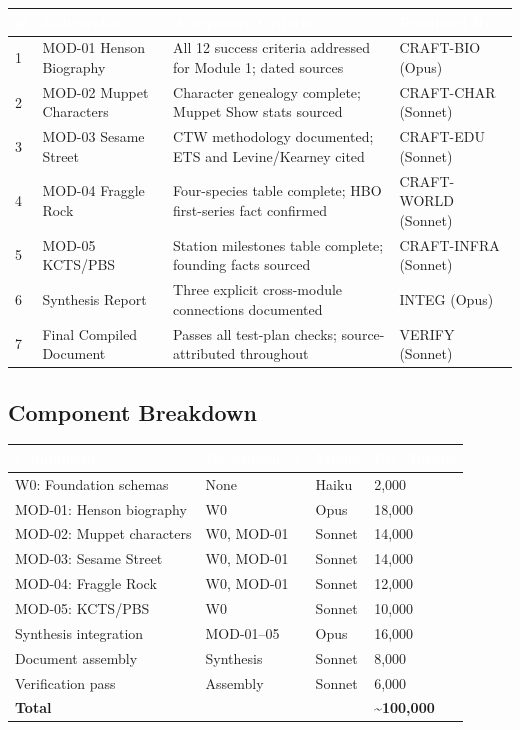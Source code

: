 \documentclass[11pt,letterpaper]{article}
\newcommand{\tableheader}[1]{\textbf{\sffamily\textcolor{white}{#1}}}
\begin{document}
\begin{center}
\begin{tabularx}{\textwidth}{C{0.5cm}L{3.5cm}XL{3cm}}
\toprule
{}
\tableheader{\#} & \tableheader{Deliverable} & \tableheader{Acceptance Criteria} & \tableheader{Produced By} \\
 & MOD-01 Henson Biography & All 12 success criteria addressed for Module 1; dated sources & CRAFT-BIO (Opus) \\
2 & MOD-02 Muppet Characters & Character genealogy complete; Muppet Show stats sourced & CRAFT-CHAR (Sonnet) \\
3 & MOD-03 Sesame Street & CTW methodology documented; ETS and Levine/Kearney cited & CRAFT-EDU (Sonnet) \\
4 & MOD-04 Fraggle Rock & Four-species table complete; HBO first-series fact confirmed & CRAFT-WORLD (Sonnet) \\
5 & MOD-05 KCTS/PBS & Station milestones table complete; founding facts sourced & CRAFT-INFRA (Sonnet) \\
6 & Synthesis Report & Three explicit cross-module connections documented & INTEG (Opus) \\
7 & Final Compiled Document & Passes all test-plan checks; source-attributed throughout & VERIFY (Sonnet) \\
\bottomrule
\end{tabularx}
\end{center}

\subsection{Component Breakdown}

\begin{center}
\begin{tabularx}{\textwidth}{L{3cm}L{2.5cm}C{1.5cm}C{2cm}}
\toprule
{}
\tableheader{Component} & \tableheader{Dependencies} & \tableheader{Model} & \tableheader{Est. Tokens} \\
\midrule
W0: Foundation schemas & None & Haiku & 2,000 \\
MOD-01: Henson biography & W0 & Opus & 18,000 \\
MOD-02: Muppet characters & W0, MOD-01 & Sonnet & 14,000 \\
MOD-03: Sesame Street & W0, MOD-01 & Sonnet & 14,000 \\
MOD-04: Fraggle Rock & W0, MOD-01 & Sonnet & 12,000 \\
MOD-05: KCTS/PBS & W0 & Sonnet & 10,000 \\
Synthesis integration & MOD-01--05 & Opus & 16,000 \\
Document assembly & Synthesis & Sonnet & 8,000 \\
Verification pass & Assembly & Sonnet & 6,000 \\
\midrule
\textbf{Total} & & & \textbf{\~{}100,000} \\
\bottomrule
\end{tabularx}
\end{center}
\end{document}
